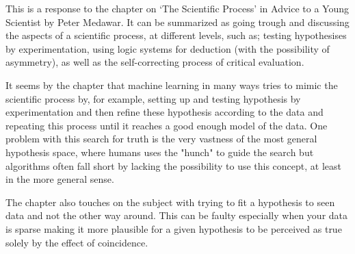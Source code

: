 \documentclass{article}
\begin{document}

This is a response to the chapter on `The Scientific Process' in 
Advice to a Young Scientist by Peter Medawar. It can be summarized as going
trough and discussing the aspects of a scientific process, at different levels,
such as; testing
hypothesises by experimentation, using logic systems for deduction (with the
possibility of asymmetry), as well as the self-correcting process of critical 
evaluation.

It seems by the chapter that machine learning in many ways tries to mimic the scientific
process by, for example, setting up and testing hypothesis by
experimentation and then refine these hypothesis according to the data and repeating
this process
until it reaches a good enough model of the data. One problem with this search
for truth is the very
vastness of the most general hypothesis space, where humans uses the "hunch" to
guide the search but algorithms often fall short by lacking the possibility
to use this concept, at least in the more general sense.

The chapter also touches on the subject with trying to fit a hypothesis to seen
data and not the other way around. This can be faulty especially when your
data is sparse making it more plausible for a given hypothesis to
be perceived as true solely by the effect of coincidence.
\end{document}
